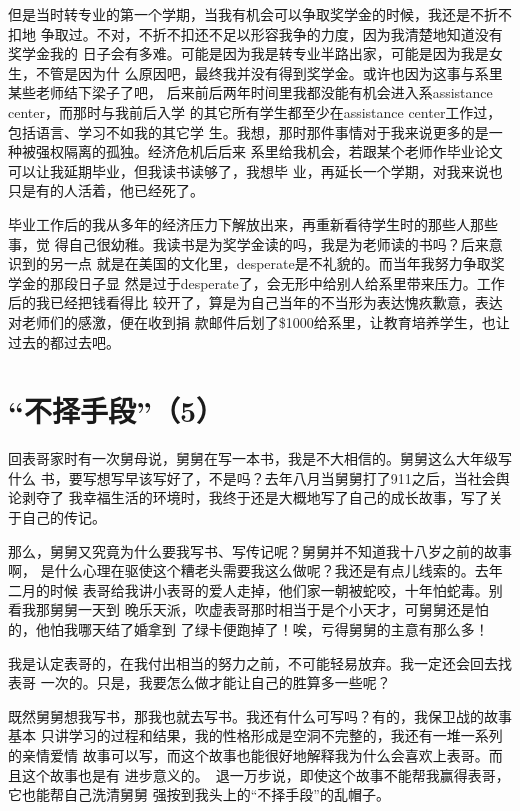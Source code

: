 \documentclass[12pt]{book}
\begin{document}
但是当时转专业的第一个学期，当我有机会可以争取奖学金的时候，我还是不折不扣地
争取过。不对，不折不扣还不足以形容我争的力度，因为我清楚地知道没有奖学金我的
日子会有多难。可能是因为我是转专业半路出家，可能是因为我是女生，不管是因为什
么原因吧，最终我并没有得到奖学金。或许也因为这事与系里某些老师结下梁子了吧，
后来前后两年时间里我都没能有机会进入系assistance center，而那时与我前后入学
的其它所有学生都至少在assistance center工作过，包括语言、学习不如我的其它学
生。我想，那时那件事情对于我来说更多的是一种被强权隔离的孤独。经济危机后后来
系里给我机会，若跟某个老师作毕业论文可以让我延期毕业，但我读书读够了，我想毕
业，再延长一个学期，对我来说也只是有的人活着，他已经死了。

毕业工作后的我从多年的经济压力下解放出来，再重新看待学生时的那些人那些事，觉
得自己很幼稚。我读书是为奖学金读的吗，我是为老师读的书吗？后来意识到的另一点
就是在美国的文化里，desperate是不礼貌的。而当年我努力争取奖学金的那段日子显
然是过于desperate了，会无形中给别人给系里带来压力。工作后的我已经把钱看得比
较开了，算是为自己当年的不当形为表达愧疚歉意，表达对老师们的感激，便在收到捐
款邮件后划了\$1000给系里，让教育培养学生，也让过去的都过去吧。
\section{“不择手段”（5）}
\label{sec-9-91}

回表哥家时有一次舅母说，舅舅在写一本书，我是不大相信的。舅舅这么大年级写什么
书，要写想写早该写好了，不是吗？去年八月当舅舅打了911之后，当社会舆论剥夺了
我幸福生活的环境时，我终于还是大概地写了自己的成长故事，写了关于自己的传记。

那么，舅舅又究竟为什么要我写书、写传记呢？舅舅并不知道我十八岁之前的故事啊，
是什么心理在驱使这个糟老头需要我这么做呢？我还是有点儿线索的。去年二月的时候
表哥给我讲小表哥的爱人走掉，他们家一朝被蛇咬，十年怕蛇毒。别看我那舅舅一天到
晚乐天派，吹虚表哥那时相当于是个小天才，可舅舅还是怕的，他怕我哪天结了婚拿到
了绿卡便跑掉了！唉，亏得舅舅的主意有那么多！

我是认定表哥的，在我付出相当的努力之前，不可能轻易放弃。我一定还会回去找表哥
一次的。只是，我要怎么做才能让自己的胜算多一些呢？

既然舅舅想我写书，那我也就去写书。我还有什么可写吗？有的，我保卫战的故事基本
只讲学习的过程和结果，我的性格形成是空洞不完整的，我还有一堆一系列的亲情爱情
故事可以写，而这个故事也能很好地解释我为什么会喜欢上表哥。而且这个故事也是有
进步意义的。　退一万步说，即使这个故事不能帮我赢得表哥，它也能帮自己洗清舅舅
强按到我头上的“不择手段”的乱帽子。
\end{document}
